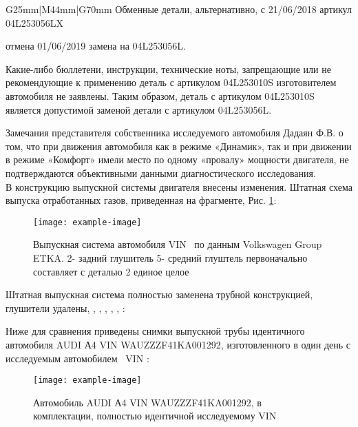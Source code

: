 \begin{longtable}{G{25mm}|M{44mm}|G{70mm}}
Обменные детали,   альтернативно, с 21/06/2018 артикул  04L253056LX 

отмена 01/06/2019  замена на  04L253056L. 

Какие-либо бюллетени, инструкции, технические ноты, запрещающие или не рекомендующие к применению деталь с артикулом 
04L253010S изготовителем автомобиля не заявлены. Таким образом,  деталь с артикулом 04L253010S  является допустимой заменой детали с артикулом 04L253056L.
 
 Замечания представителя собственника исследуемого автомобиля Дадаян Ф.В.  о том, что при движения автомобиля как в режиме «Динамик», так и при движении в режиме «Комфорт» имели место по одному «провалу» мощности двигателя,  не подтверждаются объективными  данными диагностического исследования.\\ 

 В конструкцию выпускной  системы двигателя внесены изменения. Штатная схема выпуска отработанных газов, приведенная на фрагменте, Рис. \ref{fig:gl}:
  \begin{figure}[H]
 	\centering
 	\texttt{[image: example-image]}
 	\caption{Выпускная система автомобиля VIN \vin \, по данным Volkswagen Group ETKA. 2- задний глушитель  5- средний глуштель первоначально составляет с деталью 2 единое целое}
 	\label{fig:gl}
 \end{figure}
 
Штатная выпускная система  полностью заменена трубной конструкцией, глушители удалены, , , , , , :\\
 

\vspace{5mm}

  Ниже для сравнения приведены снимки выпускной трубы  идентичного автомобиля AUDI А4 VIN WAUZZZF41KA001292,  изготовленного в один день с исследуемым автомобилем  \, VIN \vin: %
  
  
  \begin{figure}[H]
 	\centering
 	\texttt{[image: example-image]}
 	\caption{Автомобиль AUDI А4 VIN WAUZZZF41KA001292, в комплектации, полностью идентичной исследуемому VIN \vin}
 	\label{fig:4}
 \end{figure}
 

\end{longtable}
